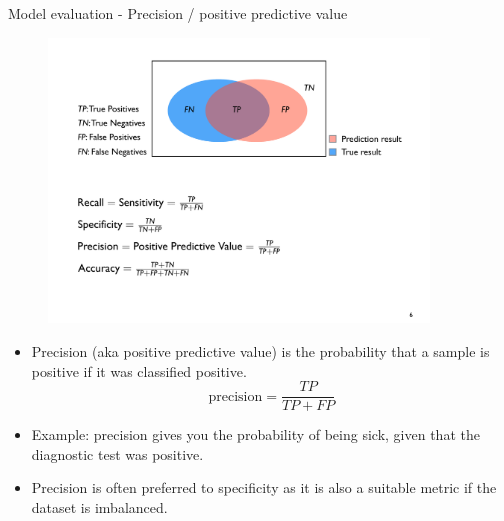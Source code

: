 \documentclass[xcolor=pdftex,dvipsnames,table]{beamer}
\begin{document}
\begin{frame}{Model evaluation - Precision / positive predictive value}
	\begin{figure}[htb]
		\includegraphics[width=0.9\textwidth]{../graphics/ModelEvaluation.pdf}
	\end{figure}
	\begin{itemize}	
		\item Precision (aka positive predictive value) is the probability that a sample is positive if it was classified positive. 
		\begin{equation}
			\text{precision} = \frac{TP}{TP + FP}
		\end{equation}
		\item Example: precision gives you the probability of being sick, given that the diagnostic test was positive. 
		\item Precision is often preferred to specificity as it is also a suitable metric if the dataset is imbalanced. 
	\end{itemize}
\end{frame}
\end{document}
